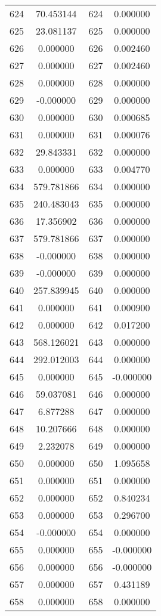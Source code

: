 \documentclass[12pt]{article}
\begin{document}
\begin{longtable}{@{}cccc@{}}
624 & 70.453144 & 624 & 0.000000 \\
625 & 23.081137 & 625 & 0.000000 \\
626 & 0.000000 & 626 & 0.002460 \\
627 & 0.000000 & 627 & 0.002460 \\
628 & 0.000000 & 628 & 0.000000 \\
629 & -0.000000 & 629 & 0.000000 \\
630 & 0.000000 & 630 & 0.000685 \\
631 & 0.000000 & 631 & 0.000076 \\
632 & 29.843331 & 632 & 0.000000 \\
633 & 0.000000 & 633 & 0.004770 \\
634 & 579.781866 & 634 & 0.000000 \\
635 & 240.483043 & 635 & 0.000000 \\
636 & 17.356902 & 636 & 0.000000 \\
637 & 579.781866 & 637 & 0.000000 \\
638 & -0.000000 & 638 & 0.000000 \\
639 & -0.000000 & 639 & 0.000000 \\
640 & 257.839945 & 640 & 0.000000 \\
641 & 0.000000 & 641 & 0.000900 \\
642 & 0.000000 & 642 & 0.017200 \\
643 & 568.126021 & 643 & 0.000000 \\
644 & 292.012003 & 644 & 0.000000 \\
645 & 0.000000 & 645 & -0.000000 \\
646 & 59.037081 & 646 & 0.000000 \\
647 & 6.877288 & 647 & 0.000000 \\
648 & 10.207666 & 648 & 0.000000 \\
649 & 2.232078 & 649 & 0.000000 \\
650 & 0.000000 & 650 & 1.095658 \\
651 & 0.000000 & 651 & 0.000000 \\
652 & 0.000000 & 652 & 0.840234 \\
653 & 0.000000 & 653 & 0.296700 \\
654 & -0.000000 & 654 & 0.000000 \\
655 & 0.000000 & 655 & -0.000000 \\
656 & 0.000000 & 656 & -0.000000 \\
657 & 0.000000 & 657 & 0.431189 \\
658 & 0.000000 & 658 & 0.000000 \\

\end{longtable}
\end{document}
